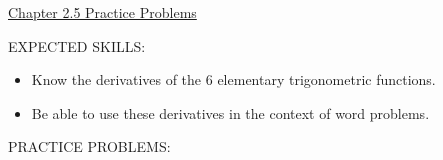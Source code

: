 \documentclass[12pt]{article}
\begin{document}
\begin{center}
\underline{\LARGE{Chapter 2.5 Practice Problems}}
\end{center}

\noindent EXPECTED SKILLS:

\begin{itemize}

\item Know the derivatives of the 6 elementary trigonometric functions.

\item Be able to use these derivatives in the context of word problems.

\end{itemize}

\noindent PRACTICE PROBLEMS:

\medskip
\end{document}
